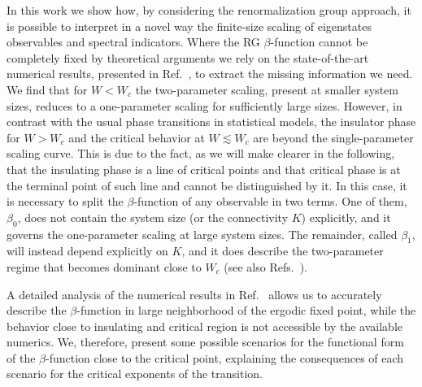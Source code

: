 \documentclass[reprint,aps,prl,superscriptaddress,english,nolongbibliography]{revtex4-1}
\begin{document}
In this work we show how, by considering the renormalization group approach, it is possible to interpret in a novel way the finite-size scaling of eigenstates observables and spectral indicators. Where the RG $\beta$-function cannot be completely fixed by theoretical arguments we rely on the state-of-the-art numerical results, presented in Ref.~\cite{sierant2023universality}, to extract the missing information we need.  We find that for $W<W_{c}$ the two-parameter scaling, present at smaller system sizes, reduces to a one-parameter scaling for sufficiently large sizes.  However, in contrast with the usual phase transitions in statistical models, the insulator phase for $W>W_{c}$ and the critical behavior at $W\lesssim W_c$ are beyond the single-parameter scaling curve. This is due to the fact, as we will make clearer in the following, that the insulating phase is a line of critical points and that critical phase is at the terminal point of such line and cannot be distinguished by it. In this case, it is necessary to split the $\beta$-function of any observable in two terms.  One of them, $\beta_0$, does not contain the system size (or the connectivity $K$) explicitly, and it governs the one-parameter scaling at large system sizes. The remainder, called $\beta_1$, will instead depend explicitly on $K$, and it does describe the two-parameter regime that becomes dominant close to $W_c$ (see also Refs.~\cite{arenz2023wegner,zirnbauer2023wegner}).

A detailed analysis of the numerical results in Ref.~\cite{sierant2023universality} allows us to accurately describe the $\beta$-function in large neighborhood of the ergodic fixed point, while the behavior close to insulating and critical region is not accessible by the available numerics. We, therefore, present some possible scenarios for the functional form of the $\beta$-function close to the critical point, explaining the consequences of each scenario for the critical exponents of the transition.
\end{document}
